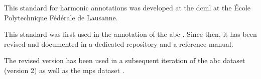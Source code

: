 

This standard for harmonic annotations was developed at the
\gls{dcml} at the \'Ecole Polytechnique F\'ed\'erale de
Lausanne.

This standard was first used in the annotation of the
\gls{abc}
\parencite{neuwirth2018annotated}. Since then, it has been
revised and documented in a dedicated
repository
and a reference
manual.

The revised version has been used in a subsequent iteration
of the \gls{abc} dataset (version 2) as well as the
\gls{mps} dataset \parencite{hentschel2021annotated}.
